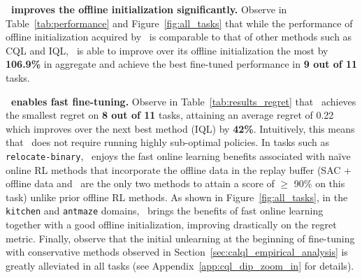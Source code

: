 \textbf{\methodname\ improves the offline initialization significantly.} Observe in Table~\ref{tab:performance} and Figure~\ref{fig:all_tasks} that while the performance of offline initialization acquired by \methodname\ is comparable to that of other methods such as CQL and IQL, \methodname\ is able to improve over its offline initialization the most by \textbf{106.9\%} in aggregate and achieve the best fine-tuned performance in \textbf{9 out of 11} tasks.

\textbf{\methodname\ enables fast fine-tuning.} 
Observe in Table~\ref{tab:results_regret} that \methodname\ achieves the smallest regret on \textbf{8 out of 11} tasks, attaining an average regret of 0.22 which improves over the next best method (IQL) by \textbf{42\%}. Intuitively, this means that \methodname\ does not require running highly sub-optimal policies. In tasks such as \texttt{relocate-binary}, \methodname\ enjoys the fast online learning benefits associated with na\"ive online RL methods that incorporate the offline data in the replay buffer (SAC + offline data and \methodname\ are the only two methods to  attain a score of $\geq$ 90\% on this task) unlike prior offline RL methods. As shown in Figure~\ref{fig:all_tasks}, in the \texttt{kitchen} and \texttt{antmaze} domains, \methodname\ brings the benefits of fast online learning together with a good offline initialization, improving drastically on the regret metric. Finally, observe that the initial unlearning at the beginning of fine-tuning with conservative methods observed in Section~\ref{sec:calql_empirical_analysis} is greatly alleviated in all tasks (see Appendix~\ref{app:cql_dip_zoom_in} for details).



